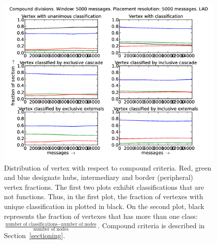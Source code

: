 \documentclass[%
 aip,
 jmp,%
 amsmath,amssymb,
 reprint,%
]{revtex4-1}
\begin{document}
\begin{figure}[hbtp] 
   \centering
        \includegraphics[width=\textwidth]{figs/LAD/5000_2}
    \caption{Distribution of vertex with respect to compound criteria. Red, green and blue designate hubs, intermediary and border (peripheral) vertex fractions. The first two plots exhibit classifications that are not functions. Thus, in the first plot, the fraction of vertexes with unique classification in plotted in black. On the second plot, black represents the fraction of vertexes that has more than one class: $\frac{\text{number of classifications} - \text{number of nodes}}{\text{number of nodes}}$. Compound criteria is described in Section~\ref{sectioning}.}
    \label{fig:lad5000_}
\end{figure}
\end{document}

